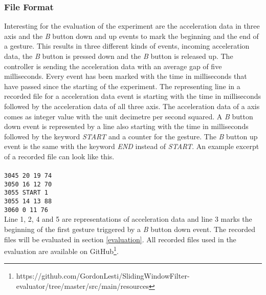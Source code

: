 \subsubsection{File Format} \label{file_format}
Interesting for the evaluation of the experiment are the acceleration data in three axis and the \textit{B} button down
and up events to mark the beginning and the end of a gesture. This results in three different kinds of events, incoming
acceleration data, the \textit{B} button is pressed down and the \textit{B} button is released up. The controller is
sending the acceleration data with an average gap of five milliseconds. Every event has been marked with the time
in milliseconds that have passed since the starting of the experiment. The representing line in a recorded file for a
acceleration data event is starting with the time in milliseconds followed by the acceleration data of all three axis.
The acceleration data of a axis comes as integer value with the unit decimetre per second squared. A \textit{B} button
down event is represented by a line also starting with the time in milliseconds followed by the keyword \textit{START}
and a counter for the gesture. The \textit{B} button up event is the same with the keyword \textit{END} instead of
\textit{START}. An example excerpt of a recorded file can look like this.\\\\
\verb!3045 20 19 74!\\
\verb!3050 16 12 70!\\
\verb!3055 START 1!\\
\verb!3055 14 13 88!\\
\verb!3060 0 11 76!\\

Line 1, 2, 4 and 5 are representations of acceleration data and line 3 marks the beginning of the first gesture
triggered by a \textit{B} button down event. The recorded files will be evaluated in section \ref{evaluation}. All
recorded files used in the evaluation are available on
GitHub\footnote{https://github.com/GordonLesti/SlidingWindowFilter-evaluator/tree/master/src/main/resources}.
